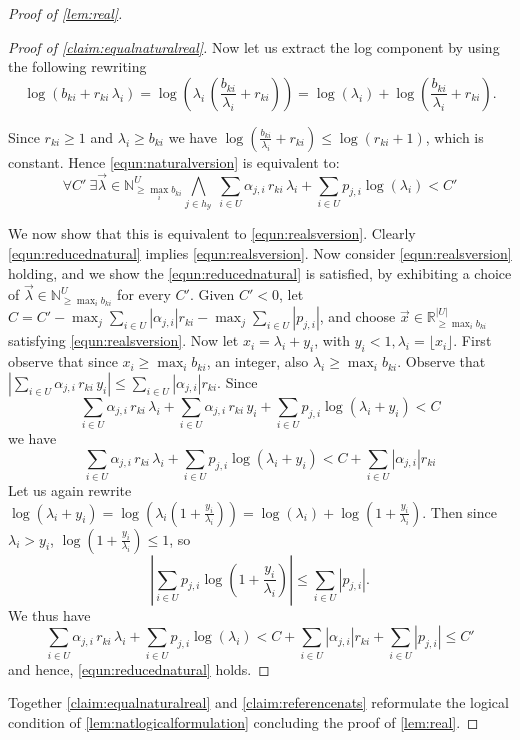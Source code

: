 \documentclass{lmcs}
\theoremstyle{plain}
\theoremstyle{definition}
\theoremstyle{remark}
\newenvironment{subproof}[1][\proofname]{\renewcommand{\qedsymbol}{{$\blacksquare$}}\begin{proof}[#1]}{\end{proof}}
\newcommand\pbra[1]{\left( #1 \right)}
\newcommand\abs[1]{\left\vert #1 \right\vert}
\newcommand\revar{x}
\newcommand\revec{\vec{x}}
\newcommand\intvar{\lambda}
\newcommand\basevecraw{b}
\newcommand\pvecraw{r}
\begin{document}
\begin{proof}[Proof of \cref{lem:real}]
\begin{subproof}[Proof of \cref{claim:equalnaturalreal}]
Now let us extract the log component by using the following rewriting \[\log(\basevecraw_{ki} + \pvecraw_{ki}\, \lambda_i) = 
\log\pbra{\lambda_i\,\pbra{\frac{\basevecraw_{ki}}{\lambda_i} + \pvecraw_{ki}}} = 
\log(\lambda_i) + \log\pbra{\frac{\basevecraw_{ki}}{\lambda_i} + \pvecraw_{ki}}.\]

Since $\pvecraw_{ki} \ge 1$ and $\lambda_i \ge \basevecraw_{ki}$ we have $\log\pbra{\frac{\basevecraw_{ki}}{\lambda_i} + \pvecraw_{ki}}  \le \log(\pvecraw_{ki} + 1)$, which is constant. Hence \cref{equn:naturalversion} is equivalent to:
\begin{equation}\label{equn:reducednatural}
\forall C'\  \exists \vec{\lambda} \in \mathbb{N}^{U}_{\ge \max_i{\basevecraw_{ki}}}
\bigwedge_{j \in h_\mathcal{Y}}\ \sum_{i \in U} \alpha_{j,i}\, \pvecraw_{ki}\, \lambda_i + \sum_{i \in U}  p_{j,i}\log(\lambda_i) < C'
\end{equation}

We now show that this is equivalent to \cref{equn:realsversion}. Clearly  \cref{equn:reducednatural} implies \cref{equn:realsversion}. Now consider  \cref{equn:realsversion} holding, and we show the \cref{equn:reducednatural} is satisfied, by exhibiting a choice of $ \vec{\lambda} \in \mathbb{N}^{U}_{\ge \max_i{\basevecraw_{ki}}}$ for every $C'$.
%
Given $C' < 0 $, let $C = C' - \max_j\sum_{i \in U} |\alpha_{j,i}|\pvecraw_{ki} - \max_j\sum_{i \in U} |p_{j,i}|$, and choose $\revec \in \mathbb{R}^{|U|}_{\ge \max_i{\basevecraw_{ki}}}$ satisfying \cref{equn:realsversion}.
%
Now let $\revar_i = \intvar_i + y_i$, with $y_i  <  1, \intvar_i = \lfloor \revar_i \rfloor$. First observe that since $\revar_i \ge \max_i \basevecraw_{ki}$, an integer, also $\intvar_i \ge \max_i \basevecraw_{ki}$.
%
Observe that ${\abs{\sum_{i \in U} \alpha_{j,i}\, \pvecraw_{ki}\,  y_i } }  \le \sum_{i \in U} |\alpha_{j,i}|\pvecraw_{ki}$. Since
\[ \sum_{i \in U} \alpha_{j,i}\, \pvecraw_{ki}\, \intvar_i + {\sum_{i \in U} \alpha_{j,i}\, \pvecraw_{ki}\,  y_i} + \sum_{i \in U}  p_{j,i}\log(\intvar_i + y_i) < C
\]
we have
\[ \sum_{i \in U} \alpha_{j,i}\, \pvecraw_{ki}\, \intvar_i  + \sum_{i \in U}  p_{j,i}\log(\intvar_i + y_i) < C  + \sum_{i \in U} |\alpha_{j,i}|\pvecraw_{ki}
\]
Let us again rewrite $\log(\intvar_i + y_i) = \log\pbra{\intvar_i\pbra{1 + \frac{y_i}{\intvar_i}}}= \log(\intvar_i) + \log\pbra{1 + \frac{y_i}{\intvar_i}}$. Then since $\intvar_i > y_i$, $\log\pbra{1 + \frac{y_i}{\intvar_i}} \le 1$, so \[{\abs{\sum_{i \in U}  p_{j,i}\log\pbra{1 + \frac{y_i}{\intvar_i}} }} \le \sum_{i \in U}  |p_{j,i}|.\] 
We thus have
\[ \sum_{i \in U} \alpha_{j,i}\, \pvecraw_{ki}\, \intvar_i  + \sum_{i \in U}  p_{j,i}\log(\intvar_i)< C  + \sum_{i \in U} |\alpha_{j,i}|\pvecraw_{ki} + \sum_{i \in U} |p_{j,i}| \le C'
\]
and hence, \cref{equn:reducednatural} holds.\end{subproof}

Together \cref{claim:equalnaturalreal} and \cref{claim:referencenats} reformulate the logical condition of \cref{lem:natlogicalformulation} concluding the proof of \cref{lem:real}.
\end{proof}
\end{document}
